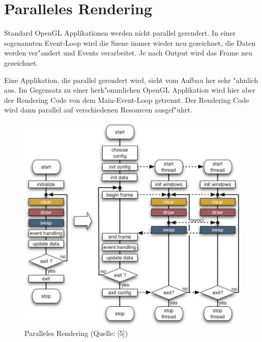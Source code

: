 \section{Paralleles Rendering}
Standard OpenGL Applikationen werden nicht parallel gerendert. In einer sogenannten Event-Loop wird die Szene immer wieder neu gezeichnet, die Daten werden ver"andert und Events verarbeitet. Je nach Output wird das Frame neu gezeichnet.

Eine Applikation, die parallel gerendert wird, sieht vom Aufbau her sehr "ahnlich aus. Im Gegensatz zu einer herk"ommlichen OpenGL Applikation wird hier aber der Rendering Code von dem Main-Event-Loop getrennt. Der Rendering Code wird dann parallel auf verschiedenen Resourcen ausgef"uhrt.

\begin{figure}[ht]
\begin{center}
\includegraphics[scale=0.4]{../figures/parallel_rendering_execution_flow}
\caption{Paralleles Rendering (Quelle: [5])}
\end{center}
\end{figure}


